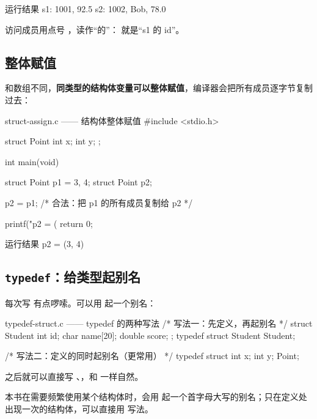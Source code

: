 \begin{outbox}{运行结果}
s1: 1001, 92.5
s2: 1002, Bob, 78.0
\end{outbox}

访问成员用点号 ，读作“的”： 就是“s1 的 id”。

\subsection{整体赋值}

和数组不同，\textbf{同类型的结构体变量可以整体赋值}，编译器会把所有成员逐字节复制过去：

\begin{codebox}{struct-assign.c —— 结构体整体赋值}
#include <stdio.h>

struct Point {
    int x;
    int y;
};

int main(void)
{
    struct Point p1 = {3, 4};
    struct Point p2;

    p2 = p1;        /* 合法：把 p1 的所有成员复制给 p2 */

    printf("p2 = (%
    return 0;
}
\end{codebox}

\begin{outbox}{运行结果}
p2 = (3, 4)
\end{outbox}

\subsection{\texttt{typedef}：给类型起别名}

每次写  有点啰嗦。可以用  起一个别名：

\begin{codebox}{typedef-struct.c —— typedef 的两种写法}
/* 写法一：先定义，再起别名 */
struct Student {
    int id;
    char name[20];
    double score;
};
typedef struct Student Student;

/* 写法二：定义的同时起别名（更常用） */
typedef struct {
    int x;
    int y;
} Point;
\end{codebox}

之后就可以直接写 、，和  一样自然。

\begin{tipbox}[本书的风格]
本书在需要频繁使用某个结构体时，会用  起一个首字母大写的别名；只在定义处出现一次的结构体，可以直接用  写法。
\end{tipbox}

